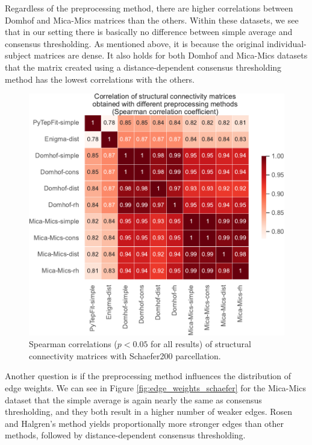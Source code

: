 Regardless of the preprocessing method, there are higher correlations between Domhof and Mica-Mics matrices than the others. Within these datasets, we see that in our setting there is basically no difference between simple average and consensus thresholding. As mentioned above, it is because the original individual-subject matrices are dense. It also holds for both Domhof and Mica-Mics datasets that the matrix created using a distance-dependent consensus thresholding method has the lowest correlations with the others.

\begin{figure}[h!]

  \begin{center}
    \includegraphics[width=\textwidth]{images/nootebook_generated/comparing_sc_matrices/schaefer/correlations_all_matrices_Spearman.pdf}
  \end{center}
  \caption[Correlations of SC matrices (Schaefer200 parcellation)]{Spearman correlations ($p<0.05$ for all results) of structural connectivity matrices with Schaefer200 parcellation. }
  \label{fig:sc_correlations}
\end{figure}

Another question is if the preprocessing method influences the distribution of edge weights. We can see in Figure \ref{fig:edge_weights_schaefer} for the Mica-Mics dataset that the simple average is again nearly the same as consensus thresholding, and they both result in a higher number of weaker edges. Rosen and Halgren's method yields proportionally more stronger edges than other methods, followed by distance-dependent consensus thresholding.



